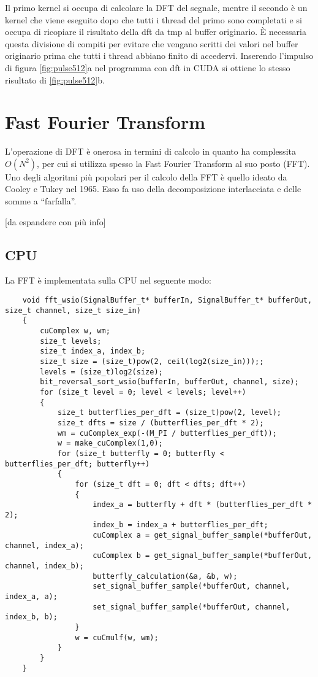 Il primo kernel si occupa di calcolare la DFT del segnale, mentre il secondo è un kernel che viene eseguito dopo che tutti i thread del primo sono completati e si occupa di ricopiare il risultato della dft da tmp al buffer originario. È necessaria questa divisione di compiti per evitare che vengano scritti dei valori nel buffer originario prima che tutti i thread abbiano finito di accedervi. Inserendo l'impulso di figura \ref{fig:pulse512}a nel programma con dft in CUDA si ottiene lo stesso risultato di \ref{fig:pulse512}b.

\section{Fast Fourier Transform}
L'operazione di DFT è onerosa in termini di calcolo in quanto ha complessita $O(N^2)$, per cui si utilizza spesso la Fast Fourier Transform al suo posto (FFT). Uno degli algoritmi più popolari per il calcolo della FFT è quello ideato da Cooley e Tukey nel 1965. Esso fa uso della decomposizione interlacciata e delle somme a ``farfalla''.

[da espandere con più info]

\subsection{CPU}
La FFT è implementata sulla CPU nel seguente modo:

\begin{lstlisting}
    void fft_wsio(SignalBuffer_t* bufferIn, SignalBuffer_t* bufferOut, size_t channel, size_t size_in)
    {
        cuComplex w, wm;
        size_t levels;
        size_t index_a, index_b;
        size_t size = (size_t)pow(2, ceil(log2(size_in)));;
        levels = (size_t)log2(size);
        bit_reversal_sort_wsio(bufferIn, bufferOut, channel, size);
        for (size_t level = 0; level < levels; level++)
        {
            size_t butterflies_per_dft = (size_t)pow(2, level);
            size_t dfts = size / (butterflies_per_dft * 2);
            wm = cuComplex_exp(-(M_PI / butterflies_per_dft));
            w = make_cuComplex(1,0);
            for (size_t butterfly = 0; butterfly < butterflies_per_dft; butterfly++)
            {
                for (size_t dft = 0; dft < dfts; dft++)
                {
                    index_a = butterfly + dft * (butterflies_per_dft * 2);
                    index_b = index_a + butterflies_per_dft;
                    cuComplex a = get_signal_buffer_sample(*bufferOut, channel, index_a);
                    cuComplex b = get_signal_buffer_sample(*bufferOut, channel, index_b);
                    butterfly_calculation(&a, &b, w);
                    set_signal_buffer_sample(*bufferOut, channel, index_a, a);
                    set_signal_buffer_sample(*bufferOut, channel, index_b, b);
                }
                w = cuCmulf(w, wm);
            }
        }
    }
\end{lstlisting}

